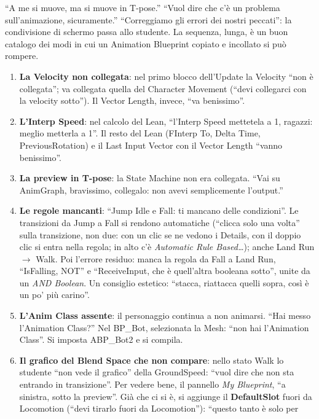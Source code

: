 ``A me si muove, ma si muove in T-pose.'' ``Vuol dire che c'è un problema
sull'animazione, sicuramente.'' ``Correggiamo gli errori dei nostri peccati'': la
condivisione di schermo passa allo studente. La sequenza, lunga, è un buon catalogo dei
modi in cui un Animation Blueprint copiato e incollato si può rompere.
\begin{enumerate}
  \item \textbf{La Velocity non collegata}: nel primo blocco dell'Update la Velocity
        ``non è collegata''; va collegata quella del Character Movement (``devi collegarci
        con la velocity sotto''). Il Vector Length, invece, ``va benissimo''.
  \item \textbf{L'Interp Speed}: nel calcolo del Lean, ``l'Interp Speed mettetela a 1,
        ragazzi: meglio metterla a 1''. Il resto del Lean (FInterp To, Delta Time,
        PreviousRotation) e il Last Input Vector con il Vector Length ``vanno benissimo''.
  \item \textbf{La preview in T-pose}: la State Machine non era collegata. ``Vai su
        AnimGraph, bravissimo, collegalo: non avevi semplicemente l'output.''
  \item \textbf{Le regole mancanti}: ``Jump Idle e Fall: ti mancano delle condizioni''.
        Le transizioni da Jump a Fall si rendono automatiche (``clicca solo una volta'' sulla
        transizione, non due: con un clic se ne vedono i Details, con il doppio clic si
        entra nella regola; in alto c'è \emph{Automatic Rule Based\dots}); anche Land Run
        $\rightarrow$ Walk. Poi l'errore residuo: manca la regola da Fall a Land Run,
        ``IsFalling, NOT'' e ``ReceiveInput, che è quell'altra booleana sotto'', unite da un
        \emph{AND Boolean}. Un consiglio estetico: ``stacca, riattacca quelli sopra, così è
        un po' più carino''.
  \item \textbf{L'Anim Class assente}: il personaggio continua a non animarsi. ``Hai messo
        l'Animation Class?'' Nel BP\_Bot, selezionata la Mesh: ``non hai l'Animation
        Class''. Si imposta ABP\_Bot2 e si compila.
  \item \textbf{Il grafico del Blend Space che non compare}: nello stato Walk lo studente
        ``non vede il grafico'' della GroundSpeed: ``vuol dire che non sta entrando in
        transizione''. Per vedere bene, il pannello \emph{My Blueprint}, ``a sinistra, sotto
        la preview''. Già che ci si è, si aggiunge il \textbf{DefaultSlot} fuori da
        Locomotion (``devi tirarlo fuori da Locomotion''): ``questo tanto è solo per

\end{enumerate}
